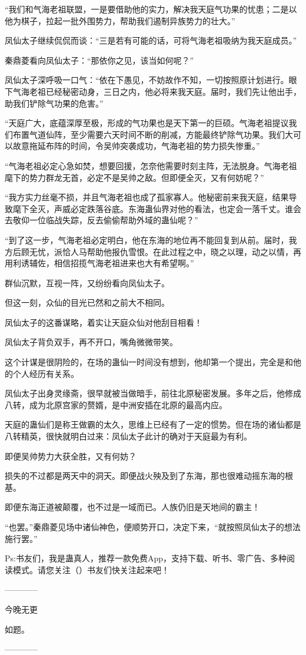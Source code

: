 \begin{this_body}
“我们和气海老祖联盟，一是要借助他的实力，解决我天庭气功果的忧患；二是以他为棋子，拉起一批外围势力，帮助我们遏制异族势力的壮大。”

凤仙太子继续侃侃而谈：“三是若有可能的话，可将气海老祖吸纳为我天庭成员。”

秦鼎菱看向凤仙太子：“那依你之见，该当如何呢？”

凤仙太子深呼吸一口气：“依在下愚见，不妨故作不知，一切按照原计划进行。眼下气海老祖已经秘密动身，三日之内，他必将来我天庭。届时，我们先让他出手，助我们铲除气功果的危害。”

“天庭广大，底蕴深厚至极，形成的气功果也是天下第一的巨硕。气海老祖提议我们布置气道仙阵，至少需要六天时间不断的削减，方能最终铲除气功果。我们大可以故意拖延布阵的时间，令吴帅突袭成功，气海老祖的势力损失惨重。”

“气海老祖必定心急如焚，想要回援，怎奈他需要时刻主阵，无法脱身。气海老祖麾下的势力群龙无首，必定不是吴帅之敌。但即便全灭，又有何妨呢？”

“我方实力丝毫不损，并且气海老祖也成了孤家寡人。他秘密前来我天庭，结果导致麾下全灭，声威必定跌落谷底。东海蛊仙界对他的看法，也定会一落千丈。谁会去敬仰一位临战失踪，反去偷偷帮助外域的蛊仙呢？”

“到了这一步，气海老祖必定明白，他在东海的地位再不能回复到从前。届时，我方后顾无忧，派恰人马帮助他报仇雪恨。在此过程之中，晓之以理，动之以情，再用利诱辅佐，相信招揽气海老祖进来也大有希望啊。”

群仙沉默，互视一阵，又纷纷看向凤仙太子。

但这一刻，众仙的目光已然和之前大不相同。

凤仙太子的这番谋略，着实让天庭众仙对他刮目相看！

凤仙太子背负双手，再不开口，嘴角微微带笑。

这个计谋是很阴险的，在场的蛊仙一时间没有想到，他却第一个提出，完全是和他的个人经历有关系。

凤仙太子出身灵缘斋，很早就被当做暗手，前往北原秘密发展。多年之后，他修成八转，成为北原宫家的赘婿，是中洲安插在北原的最高内应。

天庭的蛊仙们是称王做霸的太久，思维上已经有了一定的惯势。但在场的诸仙都是八转精英，很快就明白过来：凤仙太子此计的确对于天庭最为有利。

即便吴帅势力大获全胜，又有何妨？

损失的不过都是两天中的洞天。即便战火殃及到了东海，那也很难动摇东海的根基。

即便东海正道被颠覆，也不过是一域而已。人族仍旧是天地间的霸主！

“也罢。”秦鼎菱见场中诸仙神色，便顺势开口，决定下来，“就按照凤仙太子的想法施行罢。”

Ps:书友们，我是蛊真人，推荐一款免费App，支持下载、听书、零广告、多种阅读模式。请您关注（）书友们快关注起来吧！

------------

今晚无更

如题。

------------

\end{this_body}


